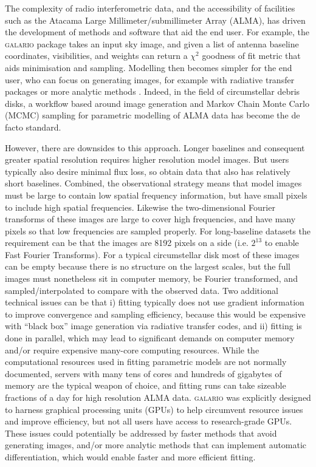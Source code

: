 \documentclass[fleqn,usenatbib]{mnras}
\begin{document}
The complexity of radio interferometric data, and the accessibility of facilities such as the Atacama Large Millimeter/submillimeter Array (ALMA), has driven the development of methods and software that aid the end user. For example, the \textsc{galario} package \citep{2018MNRAS.476.4527T} takes an input sky image, and given a list of antenna baseline coordinates, visibilities, and weights can return a $\chi^2$ goodness of fit metric that aids minimisation and sampling. Modelling then becomes simpler for the end user, who can focus on generating images, for example with radiative transfer packages \citep[e.g. RADMC,][]{2012ascl.soft02015D} or more analytic methods \citep[e.g.][]{2021MNRAS.504.4497C}. Indeed, in the field of circumstellar debris disks, a workflow based around image generation and Markov Chain Monte Carlo (MCMC) sampling for parametric modelling of ALMA data has become the de facto standard.

However, there are downsides to this approach. Longer  baselines and consequent greater spatial resolution requires higher resolution model images. But users typically also desire minimal flux loss, so obtain data that also has relatively short baselines.  Combined, the observational strategy means that model images must be large to contain low spatial frequency information, but have small pixels to include high spatial frequencies. Likewise the two-dimensional Fourier transforms of these images are large to cover high frequencies, and have many pixels so that low frequencies are sampled properly. For long-baseline datasets the requirement can be that the images are 8192 pixels on a side (i.e. $2^{13}$ to enable Fast Fourier Transforms). For a typical circumstellar disk most of these images can be empty because there is no structure on the largest scales, but the full images must nonetheless sit in computer memory, be Fourier transformed, and sampled/interpolated to compare with the observed data. Two additional technical issues can be that i) fitting typically does not use gradient information to improve convergence and sampling efficiency, because this would be expensive with ``black box'' image generation via radiative transfer codes, and ii) fitting is done in parallel, which may lead to significant demands on computer memory and/or require expensive many-core computing resources. While the computational resources used in fitting parametric models are not normally documented, servers with many tens of cores and hundreds of gigabytes of memory are the typical weapon of choice, and fitting runs can take sizeable fractions of a day for high resolution ALMA data. \textsc{galario} was explicitly designed to harness graphical processing units (GPUs) to help circumvent resource issues and improve efficiency, but not all users have access to research-grade GPUs. These issues could potentially be addressed by faster methods that avoid generating images, and/or more analytic methods that can implement automatic differentiation, which would enable faster and more efficient fitting.
\end{document}
